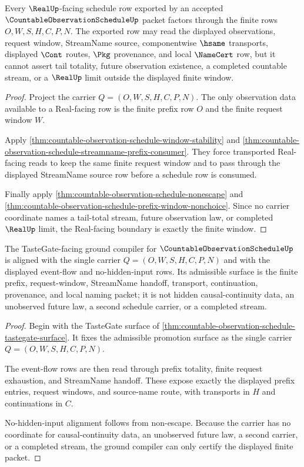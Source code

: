 \begin{theorem}
\label{thm:countable-observation-schedule-real-window-boundary}
Every $\RealUp$-facing schedule row exported by an accepted $\CountableObservationScheduleUp$ packet factors through the finite rows $O,W,S,H,C,P,N$. The exported row may read the displayed observations, request window, StreamName source, componentwise $\hsame$ transports, displayed $\Cont$ routes, $\Pkg$ provenance, and local $\NameCert$ row, but it cannot assert tail totality, future observation existence, a completed countable stream, or a $\RealUp$ limit outside the displayed finite window.
\end{theorem}
\begin{proof}
Project the carrier $Q=(O,W,S,H,C,P,N)$. The only observation data available to a Real-facing row is the finite prefix row $O$ and the finite request window $W$.

Apply \autoref{thm:countable-observation-schedule-window-stability} and \autoref{thm:countable-observation-schedule-streamname-prefix-consumer}. They force transported Real-facing reads to keep the same finite request window and to pass through the displayed StreamName source row before a schedule row is consumed.

Finally apply \autoref{thm:countable-observation-schedule-nonescape} and \autoref{thm:countable-observation-schedule-prefix-window-nonchoice}. Since no carrier coordinate names a tail-total stream, future observation law, or completed $\RealUp$ limit, the Real-facing boundary is exactly the finite window.
\end{proof}

\begin{theorem}
\label{thm:countable-observation-schedule-tastegate-ground-compiler-alignment}
The TasteGate-facing ground compiler for $\CountableObservationScheduleUp$ is aligned with the single carrier $Q=(O,W,S,H,C,P,N)$ and with the displayed event-flow and no-hidden-input rows. Its admissible surface is the finite prefix, request-window, StreamName handoff, transport, continuation, provenance, and local naming packet; it is not hidden causal-continuity data, an unobserved future law, a second schedule carrier, or a completed stream.
\end{theorem}
\begin{proof}
Begin with the TasteGate surface of \autoref{thm:countable-observation-schedule-tastegate-surface}. It fixes the admissible promotion surface as the single carrier $Q=(O,W,S,H,C,P,N)$.

The event-flow rows are then read through prefix totality, finite request exhaustion, and StreamName handoff. These expose exactly the displayed prefix entries, request windows, and source-name route, with transports in $H$ and continuations in $C$.

No-hidden-input alignment follows from non-escape. Because the carrier has no coordinate for causal-continuity data, an unobserved future law, a second carrier, or a completed stream, the ground compiler can only certify the displayed finite packet.
\end{proof}

